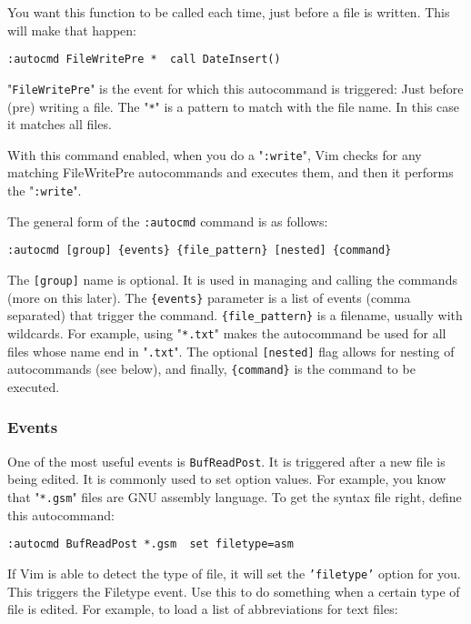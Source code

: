 You want this function to be called each time, just before a file is written.
This will make that happen:

\begin{Verbatim}[samepage=true]
 :autocmd FileWritePre *  call DateInsert()
\end{Verbatim}

"\texttt{FileWritePre}" is the event for which this autocommand is triggered: Just before (pre) writing a file.
The "\texttt{*}" is a pattern to match with the file name.
In this case it matches all files.

With this command enabled, when you do a "\texttt{:write}", Vim checks for any matching FileWritePre autocommands and executes them, and then it performs the "\texttt{:write}".

The general form of the \texttt{:autocmd} command is as follows:

\begin{Verbatim}[samepage=true]
 :autocmd [group] {events} {file_pattern} [nested] {command}
\end{Verbatim}

The \texttt{[group]} name is optional.
It is used in managing and calling the commands (more on this later).
The \texttt{\{events\}} parameter is a list of events (comma separated) that trigger the command.
\texttt{\{file\_pattern\}} is a filename, usually with wildcards.
For example, using "\texttt{*.txt}" makes the autocommand be used for all files whose name end in "\texttt{.txt}".
The optional \texttt{[nested]} flag allows for nesting of autocommands (see below), and finally, \texttt{\{command\}} is the command to be executed.

\subsubsection{Events}
One of the most useful events is \texttt{BufReadPost}.
It is triggered after a new file is being edited.
It is commonly used to set option values.
For example, you know that "\texttt{*.gsm}" files are GNU assembly language.
To get the syntax file right, define this autocommand:

\begin{Verbatim}[samepage=true]
 :autocmd BufReadPost *.gsm  set filetype=asm
\end{Verbatim}

If Vim is able to detect the type of file, it will set the \texttt{'filetype'} option for you.
This triggers the Filetype event.
Use this to do something when a certain type of file is edited.
For example, to load a list of abbreviations for text files:

